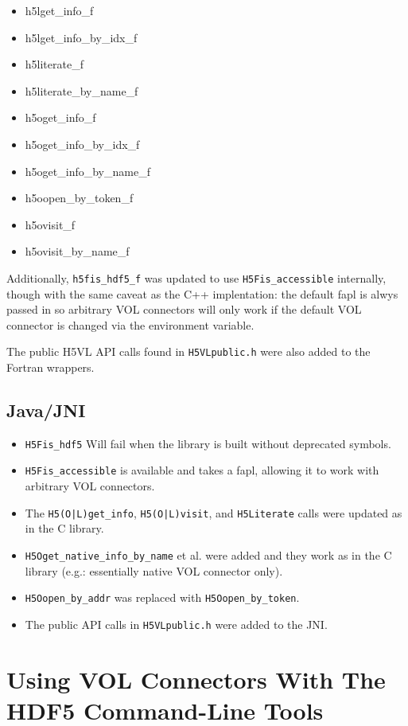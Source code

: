 \begin{itemize}
    \item h5lget\_info\_f
    \item h5lget\_info\_by\_idx\_f
    \item h5literate\_f
    \item h5literate\_by\_name\_f
    \item h5oget\_info\_f
    \item h5oget\_info\_by\_idx\_f
    \item h5oget\_info\_by\_name\_f
    \item h5oopen\_by\_token\_f
    \item h5ovisit\_f
    \item h5ovisit\_by\_name\_f
\end{itemize}

Additionally, {\tt h5fis\_hdf5\_f} was updated to use {\tt H5Fis\_accessible}
internally, though with the same caveat as the C++ implentation: the default
fapl is alwys passed in so arbitrary VOL connectors will only work if the
default VOL connector is changed via the environment variable.

The public H5VL API calls found in {\tt H5VLpublic.h} were also added to
the Fortran wrappers.

\subsection{Java/JNI}

\begin{itemize}
    \item {\tt H5Fis\_hdf5} Will fail when the library is built without deprecated symbols.
    \item {\tt H5Fis\_accessible} is available and takes a fapl, allowing it to work with arbitrary VOL connectors.
    \item The {\tt H5(O|L)get\_info}, {\tt H5(O|L)visit}, and {\tt H5Literate} calls were updated as in the C library.
    \item {\tt H5Oget\_native\_info\_by\_name} et al. were added and they work as in the C library (e.g.: essentially native VOL connector only).
    \item {\tt H5Oopen\_by\_addr} was replaced with {\tt H5Oopen\_by\_token}.
    \item The public API calls in {\tt H5VLpublic.h} were added to the JNI.
\end{itemize}

\section{Using VOL Connectors With The HDF5 Command-Line Tools}

